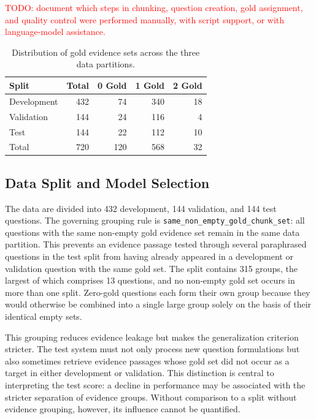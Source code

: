 \documentclass[11pt]{article}
\begin{document}
\textcolor{red}{TODO: document which steps in chunking, question creation, gold assignment, and quality control were performed manually, with script support, or with language-model assistance.}

\begin{table}[t]
\centering
\small
\begin{tabular}{lrrrr}
\toprule
\textbf{Split} & \textbf{Total} & \textbf{0 Gold} & \textbf{1 Gold} & \textbf{2 Gold} \\
\midrule
Development & 432 & 74 & 340 & 18 \\
Validation & 144 & 24 & 116 & 4 \\
Test         & 144 & 22 & 112 & 10 \\
\midrule
Total       & 720 & 120 & 568 & 32 \\
\bottomrule
\end{tabular}
\caption{Distribution of gold evidence sets across the three data partitions.}
\label{tab:gold-distribution}
\end{table}

\subsection{Data Split and Model Selection}

The data are divided into 432 development, 144 validation, and 144 test questions. The governing grouping rule is \texttt{same\_non\_empty\_gold\_chunk\_set}: all questions with the same non-empty gold evidence set remain in the same data partition. This prevents an evidence passage tested through several paraphrased questions in the test split from having already appeared in a development or validation question with the same gold set. The split contains 315 groups, the largest of which comprises 13 questions, and no non-empty gold set occurs in more than one split. Zero-gold questions each form their own group because they would otherwise be combined into a single large group solely on the basis of their identical empty sets.

This grouping reduces evidence leakage but makes the generalization criterion stricter. The test system must not only process new question formulations but also sometimes retrieve evidence passages whose gold set did not occur as a target in either development or validation. This distinction is central to interpreting the test score: a decline in performance may be associated with the stricter separation of evidence groups. Without comparison to a split without evidence grouping, however, its influence cannot be quantified.
\end{document}
